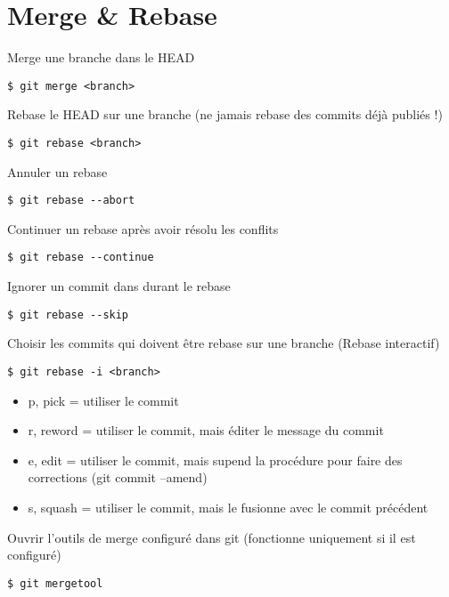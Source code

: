 \section*{Merge \& Rebase}

Merge une branche dans le HEAD
\begin{lstlisting}
$ git merge <branch>
\end{lstlisting}
Rebase le HEAD sur une branche (ne jamais rebase des commits déjà publiés !)
\begin{lstlisting}
$ git rebase <branch> 
\end{lstlisting}
Annuler un rebase 
\begin{lstlisting}
$ git rebase --abort 
\end{lstlisting}
Continuer un rebase après avoir résolu les conflits 
\begin{lstlisting}
$ git rebase --continue 
\end{lstlisting}
Ignorer un commit dans durant le rebase
\begin{lstlisting}
$ git rebase --skip
\end{lstlisting}
Choisir les commits qui doivent être rebase sur une branche (Rebase interactif) 
\begin{lstlisting}
$ git rebase -i <branch> 
\end{lstlisting}
\begin{itemize}
	\item p, pick = utiliser le commit
	\item r, reword = utiliser le commit, mais éditer le message du commit
	\item e, edit = utiliser le commit, mais supend la procédure pour faire des corrections (git commit --amend)
	\item s, squash = utiliser le commit, mais le fusionne avec le commit précédent
\end{itemize}
Ouvrir l'outils de merge configuré dans git (fonctionne uniquement si il est configuré)
\begin{lstlisting}
$ git mergetool 
\end{lstlisting}